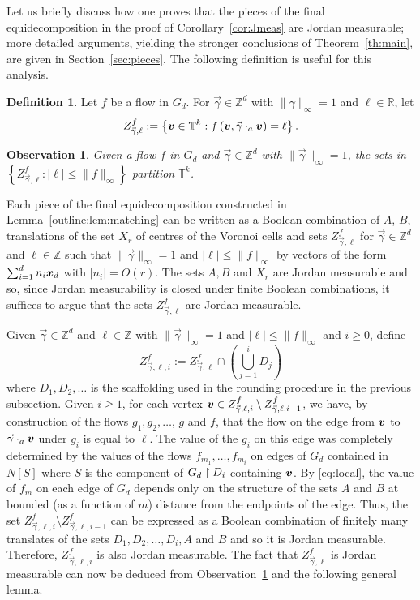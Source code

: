\documentclass[12pt,a4paper]{amsart}
\numberwithin{equation}{section}
\newtheorem{obs}[equation]{Observation}
\theoremstyle{definition}
\newtheorem{defn}[equation]{Definition}
\begin{document}
Let us briefly discuss how one proves that the pieces of the final equidecomposition in the proof of Corollary~\ref{cor:Jmeas} are Jordan measurable; more detailed arguments, yielding the stronger conclusions of Theorem~\ref{th:main}, are given in Section~\ref{sec:pieces}. The following definition is useful for this analysis.

\begin{defn}
\label{def:Zdef}
Let $f$ be a flow in $G_d$. For $\vec{\gamma}\in\mathbb{Z}^d$ with $\|\gamma\|_\infty=1$ and $\ell\in \mathbb{R}$, let
\[Z^{f}_{\vec{\gamma},\ell}:=\left\{\boldsymbol{v}\in\mathbb{T}^k: f\left(\boldsymbol{v},\vec{\gamma}\cdot_a\boldsymbol{v}\right) = \ell\right\}.\]
\end{defn}

\begin{obs}
\label{obs:Zpartition}
Given a flow $f$ in $G_d$ and $\vec{\gamma}\in \mathbb{Z}^d$ with $\|\vec{\gamma}\|_\infty=1$, the sets in $\left\{Z^{f}_{\vec{\gamma},\ell}:|\ell|\leq \|f\|_\infty\right\}$ partition $\mathbb{T}^k$. 
\end{obs}

Each piece of the final equidecomposition constructed in Lemma~\ref{outline:lem:matching} can be written as a Boolean combination of $A$, $B$,  translations of the set $X_r$ of centres of the Voronoi cells and sets $Z^{f}_{\vec{\gamma},\ell}$ for $\vec{\gamma}\in\mathbb{Z}^d$ and $\ell\in \mathbb{Z}$ such that $\|\vec{\gamma}\|_\infty=1$ and $|\ell|\leq \|f\|_\infty$ by vectors of the form $\sum_{i=1}^dn_i\boldsymbol{x}_d$ with $|n_i|=O(r)$. The sets $A,B$ and $X_r$ are Jordan measurable and so, since Jordan measurability is closed under finite Boolean combinations, it suffices to argue that the sets $Z^f_{\vec{\gamma},\ell}$ are Jordan measurable. 

Given $\vec{\gamma}\in \mathbb{Z}^d$ and $\ell\in \mathbb{Z}$ with $\|\vec{\gamma}\|_\infty=1$ and $|\ell|\leq \|f\|_\infty$ and $i\geq0$, define
\[Z^{f}_{\vec{\gamma},\ell,i}:=Z^{f}_{\vec{\gamma},\ell}\cap \left(\bigcup_{j=1}^iD_j\right)\]
where $D_1,D_2,\dots$ is the scaffolding used in the rounding procedure in the previous subsection. Given $i\geq1$, for each vertex $\boldsymbol{v}\in Z^{f}_{\vec{\gamma},\ell,i}\setminus Z^{f}_{\vec{\gamma},\ell,i-1}$, we have, by construction of the flows $g_1,g_2,\dots$, $g$ and $f$, that the flow on the edge from $\boldsymbol{v}$ to $\vec{\gamma}\cdot_a\boldsymbol{v}$ under $g_i$ is equal to $\ell$. The value of the $g_i$ on this edge was completely determined by the values of the flows $f_{m_1},\dots,f_{m_i}$ on edges of $G_d$ contained in $N[S]$ where $S$ is the component of $G_d\upharpoonright D_i$ containing $\boldsymbol{v}$. By \eqref{eq:local}, the value of $f_{m}$ on each edge of $G_d$ depends only on the structure of the sets $A$ and $B$ at bounded (as a function of $m$) distance from the endpoints of the edge. Thus, the set $Z^{f}_{\vec{\gamma},\ell,i}\setminus Z^{f}_{\vec{\gamma},\ell,i-1}$ can be expressed as a Boolean combination of finitely many translates of the sets $D_1,D_2,\dots,D_i,A$ and $B$ and so it is Jordan measurable. Therefore, $Z^{f}_{\vec{\gamma},\ell,i}$ is also Jordan measurable. The fact that $Z^{f}_{\vec{\gamma},\ell}$ is Jordan measurable can now be deduced from Observation~\ref{obs:Zpartition} and the following general lemma.
\end{document}
